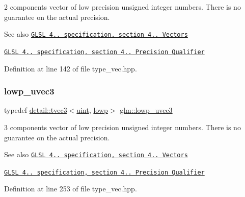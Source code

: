 2 components vector of low precision unsigned integer numbers. There is no guarantee on the actual precision.

\begin{DoxySeeAlso}{See also}
\href{http://www.opengl.org/registry/doc/GLSLangSpec.4.20.8.pdf}{\tt G\+L\+SL 4.. specification, section 4.. Vectors} 

\href{http://www.opengl.org/registry/doc/GLSLangSpec.4.20.8.pdf}{\tt G\+L\+SL 4.. specification, section 4.. Precision Qualifier} 
\end{DoxySeeAlso}


Definition at line 142 of file type\+\_\+vec.\+hpp.

\mbox{\label{group__core__precision_ga26fd88e52fe7003d41b0c57c5edffd6e}} 
\subsubsection{\texorpdfstring{lowp\+\_\+uvec3}{lowp\_uvec3}}
{\footnotesize\ttfamily typedef \hyperlink{structglm_1_1detail_1_1tvec3}{detail\+::tvec3}$<$\hyperlink{group__core__precision_ga4fd29415871152bfb5abd588334147c8}{uint}, \hyperlink{namespaceglm_a0f04f086094c747d227af4425893f545ae161af3fc695e696ce3bf69f7332bc2d}{lowp}$>$ \hyperlink{group__core__precision_ga26fd88e52fe7003d41b0c57c5edffd6e}{glm\+::lowp\+\_\+uvec3}}

3 components vector of low precision unsigned integer numbers. There is no guarantee on the actual precision.

\begin{DoxySeeAlso}{See also}
\href{http://www.opengl.org/registry/doc/GLSLangSpec.4.20.8.pdf}{\tt G\+L\+SL 4.. specification, section 4.. Vectors} 

\href{http://www.opengl.org/registry/doc/GLSLangSpec.4.20.8.pdf}{\tt G\+L\+SL 4.. specification, section 4.. Precision Qualifier} 
\end{DoxySeeAlso}


Definition at line 253 of file type\+\_\+vec.\+hpp.

\mbox{\label{group__core__precision_ga17b5f652e5c64b0034065420d844fca7}} 
